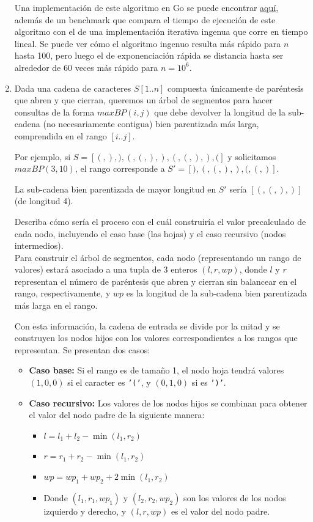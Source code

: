\documentclass[letterpaper, 12pt]{article}
\begin{document}
\begin{enumerate}
Una implementación de este algoritmo en Go se puede encontrar \href{https://gitfront.io/r/chrischriscris/swaWSXShzVoW/Tareas-CI5651-EM2024/tree/tarea3/ej2/}{aquí}, además de un benchmark que compara el tiempo de ejecución de este algoritmo con el de una implementación iterativa ingenua que corre en tiempo lineal. Se puede ver cómo el algoritmo ingenuo resulta más rápido para $n$ hasta 100, pero luego el de exponenciación rápida se distancia hasta ser alrededor de 60 veces más rápido para $n=10^6$.

\newpage

\item Dada una cadena de caracteres $S[1..n]$ compuesta únicamente de paréntesis que abren y que cierran, queremos un árbol de segmentos para hacer consultas de la forma $maxBP(i, j)$ que debe devolver la longitud de la sub-cadena (no necesariamente contigua) bien parentizada más larga, comprendida en el rango $[i..j]$.

Por ejemplo, si $S = [(, ), ), (, (, ), ), (, (, ), ), (]$ y solicitamos $maxBP(3, 10)$, el rango corresponde a $S' = [), (, (, ), ), (, (, )]$.

La sub-cadena bien parentizada de mayor longitud en $S'$ sería $[(, (, ), )]$ (de longitud 4).

Describa cómo sería el proceso con el cuál construiría el valor precalculado de cada nodo, incluyendo el caso base (las hojas) y el caso recursivo (nodos intermedios). \\

Para construir el árbol de segmentos, cada nodo (representando un rango de valores) estará asociado a una tupla de 3 enteros $(l, r, wp)$, donde $l$ y $r$ representan el número de paréntesis que abren y cierran sin balancear en el rango, respectivamente, y $wp$ es la longitud de la sub-cadena bien parentizada más larga en el rango.

Con esta información, la cadena de entrada se divide por la mitad y se construyen los nodos hijos con los valores correspondientes a los rangos que representan. Se presentan dos casos:

\begin{itemize}
    \item \textbf{Caso base:} Si el rango es de tamaño 1, el nodo hoja tendrá valores $(1, 0, 0)$ si el caracter es \texttt{'('}, y $(0, 1, 0)$ si es \texttt{')'}.
    \item \textbf{Caso recursivo:} Los valores de los nodos hijos se combinan para obtener el valor del nodo padre de la siguiente manera:
    \begin{itemize}
        \item $l = l_1 + l_2 - \min(l_1, r_2)$
        \item $r = r_1 + r_2 - \min(l_1, r_2)$
        \item $wp = wp_1 + wp_2 + 2\min(l_1, r_2)$
        \item Donde $(l_1, r_1, wp_1)$ y $(l_2, r_2, wp_2)$ son los valores de los nodos izquierdo y derecho, y $(l, r, wp)$ es el valor del nodo padre.
    \end{itemize}


\end{itemize}
\end{enumerate}
\end{document}
